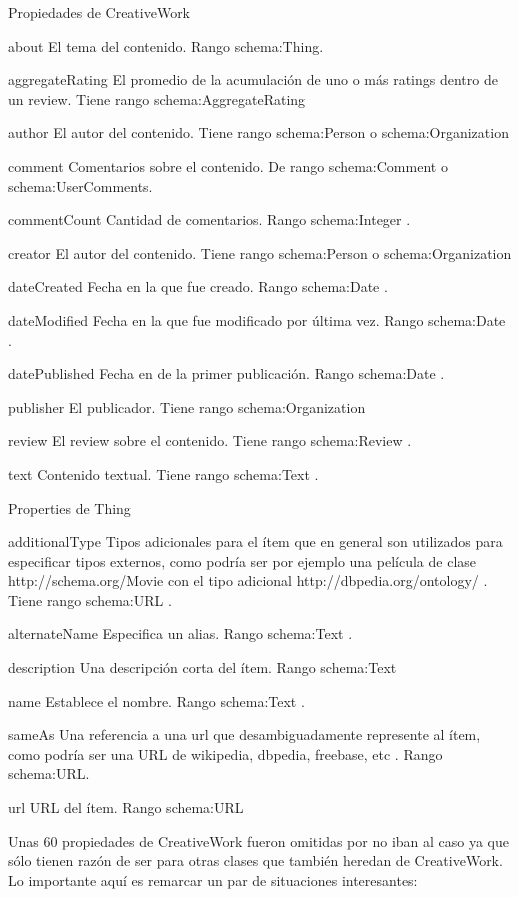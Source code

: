 Propiedades de CreativeWork 

about 	El tema del contenido. Rango schema:Thing. 

aggregateRating 	El promedio de la acumulación de uno o más ratings dentro de un review. Tiene rango schema:AggregateRating 

author 	El autor del contenido. Tiene rango schema:Person o schema:Organization

comment 	Comentarios sobre el contenido. De rango schema:Comment o schema:UserComments.

commentCount 	Cantidad de comentarios. Rango schema:Integer . 

creator 	El autor del contenido. Tiene rango schema:Person o schema:Organization

dateCreated 	Fecha en la que fue creado. Rango schema:Date .

dateModified 	Fecha en la que fue modificado por última vez. Rango schema:Date .

datePublished 	Fecha en de la primer publicación. Rango schema:Date .

publisher 	El publicador. Tiene rango schema:Organization

review 	 	El review sobre el contenido. Tiene rango schema:Review .

text 		Contenido textual. Tiene rango schema:Text .


Properties de Thing

additionalType 	 Tipos adicionales para el ítem que en general son utilizados para especificar tipos externos, como podría ser por ejemplo una película de clase http://schema.org/Movie con el tipo adicional  http://dbpedia.org/ontology/ . Tiene rango schema:URL .

alternateName 	 Especifica un alias. Rango schema:Text .

description 	Una descripción corta del ítem. Rango schema:Text 

name 		Establece el nombre. Rango schema:Text .

sameAs 		Una referencia a una url que desambiguadamente represente al ítem, como podría ser una URL de wikipedia, dbpedia, freebase, etc . Rango schema:URL.

url 		URL del ítem. Rango schema:URL

Unas 60 propiedades de CreativeWork fueron omitidas por no iban al caso ya que sólo tienen razón de ser para otras clases que 
también heredan de CreativeWork. Lo importante aquí es remarcar un par de situaciones interesantes:

